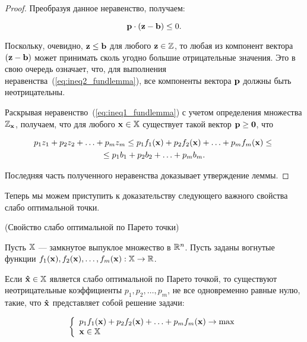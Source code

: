 \begin{proof}
Преобразуя данное неравенство, получаем:

\begin{equation}\label{eq:ineq2_fundlemma}
\mathbf{p} \cdot (\mathbf{z} - \mathbf{b}) \leq 0.
\end{equation}


Поскольку, очевидно, $\mathbf{z} \leq \mathbf{b}$ для любого $\mathbf{z} \in
\mathbb{Z}$, то любая из компонент вектора $(\mathbf{z} - \mathbf{b})$ может
принимать сколь угодно большие отрицательные значения. Это в свою
очередь означает, что, для выполнения
неравенства~(\ref{eq:ineq2_fundlemma}), все компоненты вектора
$\mathbf{p}$ должны быть неотрицательны.

Раскрывая неравенство~(\ref{eq:ineq1_fundlemma}) с учетом
определения множества $\mathbb{Z}_{\mathbf{x}}$, получаем, что для любого
$\mathbf{x}\in \mathbb{X}$ существует такой вектор $\mathbf{p}\geq \mathbf{0}$, что

\begin{multline}
p_1 z_1 + p_2 z_2 + \ldots + p_m z_m \leq p_1 f_1(\mathbf{x}) + p_2
f_2(\mathbf{x}) + \ldots + p_m f_m(\mathbf{x}) \leq {}\\ \leq p_1 b_1 + p_2
b_2 + \ldots + p_m b_m.
\end{multline}


Последняя часть полученного неравенства доказывает утверждение
леммы.

\end{proof}

Теперь мы можем приступить к доказательству следующего важного
свойства слабо оптимальной точки.

\begin{teop}(Свойство слабо оптимальной
по Парето точки)

Пусть $\mathbb{X}$ --- замкнутое выпуклое множество в $\mathbb{R}^n$. Пусть
заданы вогнутые функции $f_1(\mathbf{x}), f_2(\mathbf{x}), \ldots,
f_m(\mathbf{x}): \mathbb{X} \to \mathbb{R}$.

Если $\mathbf{\hat x} \in \mathbb{X}$ является слабо оптимальной по Парето
точкой, то существуют неотрицательные коэффициенты $p_1, p_2,
\ldots, p_m$, не все одновременно равные нулю, такие, что $\mathbf{\hat
x}$ представляет собой решение задачи:

\[ \left\{
\begin{array}{l}
 p_1 f_1(\mathbf{x}) + p_2 f_2(\mathbf{x}) + \ldots + p_m f_m(\mathbf{x})\to \max  \\
 \mathbf{x} \in \mathbb{X} \\
 \end{array} \right.
\]
\end{teop}

